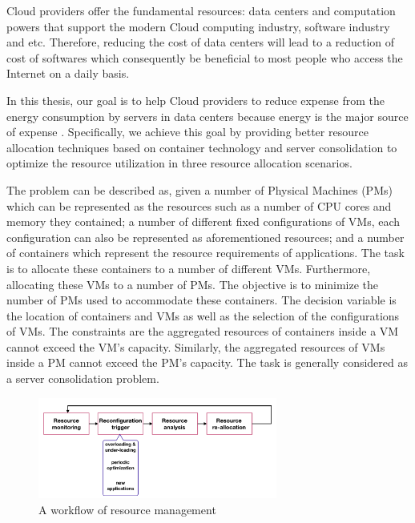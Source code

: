 Cloud providers offer the fundamental resources: data centers and computation powers that support the modern Cloud computing industry, software industry and etc. Therefore, reducing the cost of data centers will lead to a reduction of cost of softwares which consequently be beneficial to most people who access the Internet on a daily basis.

In this thesis, our goal is to help Cloud providers to reduce expense from the energy consumption by servers in data centers because energy is the major source of expense \cite{Kaplan:up01fR-k}. Specifically, we achieve this goal by providing better resource allocation techniques based on container technology and server consolidation to optimize the resource utilization in three resource allocation scenarios.

The problem can be described as, given a number of Physical Machines (PMs) which can be represented as the resources such as a number of CPU cores and memory they contained; a number of different fixed configurations of VMs, each configuration can also be represented as aforementioned resources; and a number of containers which represent the resource requirements of applications. The task is to allocate these containers to a number of different VMs. Furthermore, allocating these VMs to a number of PMs. The objective is to minimize the number of PMs used to accommodate these containers. The decision variable is the location of containers and VMs as well as the selection of the configurations of VMs. The constraints are the aggregated resources of containers inside a VM cannot exceed the VM's capacity. Similarly, the aggregated resources of VMs inside a PM cannot exceed the PM's capacity. The task is generally considered as a server consolidation problem.

\begin{figure}
	\centering
	\includegraphics[width=0.7\textwidth]{pics/workflow_management.png}
	\caption{A workflow of resource management \cite{Mishra:2012kx}}
	\label{fig:workflow}
\end{figure}

